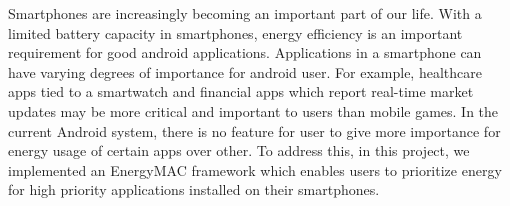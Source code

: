 Smartphones are increasingly becoming an important part of our life. With a limited battery capacity in smartphones, energy efficiency is an important requirement for good android applications. Applications in a smartphone can have varying degrees of importance for android user. For example, healthcare apps tied to a smartwatch and financial apps which report real-time market updates may be more critical and important to users than mobile games. In the current Android system, there is no feature for user to give more importance for energy usage of certain apps over other. To address this, in this project, we implemented an EnergyMAC framework which enables users to prioritize energy for high priority applications installed on their smartphones. 